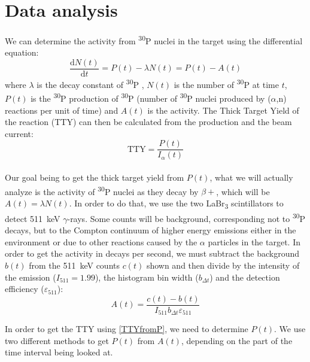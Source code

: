 \documentclass[a4paper,12pt]{report}
\newcommand{\dif}{\text{d}}
\newcommand{\ddt}[1]{\frac{\dif #1}{\dif t}}
\newcommand{\an}{($\alpha$,n) }
\newcommand{\Piso}{\textsuperscript{30}P }
\begin{document}
\section{Data analysis}
We can determine the activity from \Piso nuclei in the target using the differential equation:
\begin{equation}
	\ddt{N(t)} = P(t) -\lambda N(t) = P(t) - A(t)
	\label{activation_diffeq}
\end{equation}
where $\lambda$ is the decay constant of \Piso, $N(t)$ is the number of \Piso at time $t$, $P(t)$ is the \Piso production of \Piso (number of \Piso nuclei produced by \an reactions per unit of time) and $A(t)$ is the activity.
The Thick Target Yield of the reaction (TTY) can then be calculated from the production and the beam current:
\begin{equation}
	\text{TTY} = \frac{P(t)}{I_\alpha(t)}
	\label{TTYfromP}
\end{equation}
\\

Our goal being to get the thick target yield from $P(t)$, what we will actually analyze is the activity of \Piso nuclei as they decay by $\beta +$, which will be $A(t) = \lambda N(t)$.
In order to do that, we use the two LaBr\textsubscript{3} scintillators to detect \qty{511}{\keV} $\gamma$-rays.
Some counts will be background, corresponding not to \Piso decays, but to the Compton continuum of higher energy emissions either in the environment or due to other reactions caused by the $\alpha$ particles in the target.
In order to get the activity in decays per second, we must subtract the background $b(t)$ from the \qty{511}{\keV} counts $c(t)$ shown and then divide by the intensity of the emission ($I_{511}=\num{1.99}$), the histogram bin width ($b_{\Delta t}$) and the detection efficiency ($\varepsilon_{511}$):
\begin{equation}
	A(t) = \frac{c(t) - b(t)}{I_{511} b_{\Delta t} \varepsilon_{511}}
	\label{ctoA}
\end{equation}

In order to get the TTY using \ref{TTYfromP}, we need to determine $P(t)$.
We use two different methods to get $P(t)$ from $A(t)$, depending on the part of the time interval being looked at.
\end{document}
